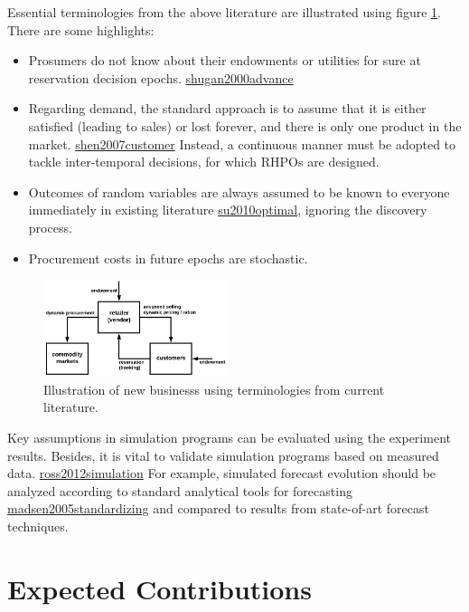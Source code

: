 \documentclass[letterpaper,8pt,twocolumn,twoside,]{pinp}
\providecommand{\tightlist}{%
  \setlength{\itemsep}{0pt}\setlength{\parskip}{0pt}}
\begin{document}
Essential terminologies from the above literature are illustrated using
figure \ref{4}. There are some highlights:

\begin{itemize}
\tightlist
\item
  Prosumers do not know about their endowments or utilities for sure at
  reservation decision epochs.
  \protect\hyperlink{reference}{shugan2000advance}
\item
  Regarding demand, the standard approach is to assume that it is either
  satisfied (leading to sales) or lost forever, and there is only one
  product in the market. \protect\hyperlink{reference}{shen2007customer}
  Instead, a continuous manner must be adopted to tackle inter-temporal
  decisions, for which RHPOs are designed.
\item
  Outcomes of random variables are always assumed to be known to
  everyone immediately in existing literature
  \protect\hyperlink{reference}{su2010optimal}, ignoring the discovery
  process.
\item
  Procurement costs in future epochs are stochastic.
\end{itemize}

\begin{figure}
\begin{center}
  \includegraphics[width=0.48\textwidth]{../../../images/4-12.png} 
\end{center}
\caption{Illustration of new businesss using terminologies from current literature.}
\label{4}
\end{figure}

Key assumptions in simulation programs can be evaluated using the
experiment results. Besides, it is vital to validate simulation programs
based on measured data.
\protect\hyperlink{reference}{ross2012simulation} For example, simulated
forecast evolution should be analyzed according to standard analytical
tools for forecasting
\protect\hyperlink{reference}{madsen2005standardizing} and compared to
results from state-of-art forecast techniques.

\hypertarget{expected-contributions}{%
\section{Expected Contributions}\label{expected-contributions}}
\end{document}
